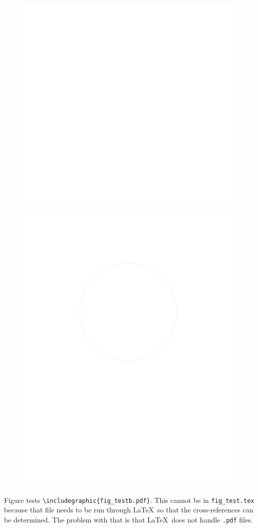 \documentclass{article}
\begin{document}
\begin{figure}
\includegraphics{fig_testb.pdf}
\end{figure}

\begin{figure}
\includegraphics{fig_testc.pdf}
\end{figure}

Figure tests \verb#\includegraphic{fig_testb.pdf}#.  This cannot be in
\texttt{fig_test.tex} because that file needs to be run through \LaTeX\
so that the cross-references can be determined.  The problem with
that is that \LaTeX\ does not handle \texttt{.pdf} files.  
\end{document}
